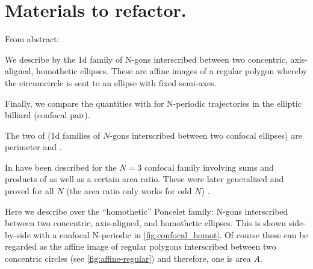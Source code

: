 \section{Materials to refactor.}

From abstract:

We describe  
by the 1d family of 
N-gons interscribed between two concentric, axis-aligned, homothetic ellipses.
These are affine images of a regular polygon whereby the circumcircle is sent to an ellipse with fixed semi-axes.

Finally, we compare the  quantities with  for N-periodic trajectories in the elliptic billiard (confocal pair). 

\bigskip

The two   
of 
(1d families of 
$N$-gons interscribed between two confocal ellipses)
are perimeter and 
\cite{sergei91}.

In \cite{reznik2020-intelligencer,garcia2020-new-properties}
 
have been described for the $N=3$ confocal family involving sums and products of  as well as a certain area ratio.
These were later generalized and proved for all $N$ (the area ratio only works for odd $N$) \cite{akopyan2020-invariants,bialy2020-invariants,caliz2020-area-product}.


Here we describe  over the ``homothetic'' Poncelet family: N-gons interscribed between two concentric, axis-aligned, and homothetic ellipses. This is shown side-by-side with a confocal N-periodic in  \cref{fig:confocal_homot}. Of course these can be regarded as the affine image of regular polygons interscribed between two concentric circles (see \cref{fig:affine-regular}) and therefore, one  is area $A$. 

